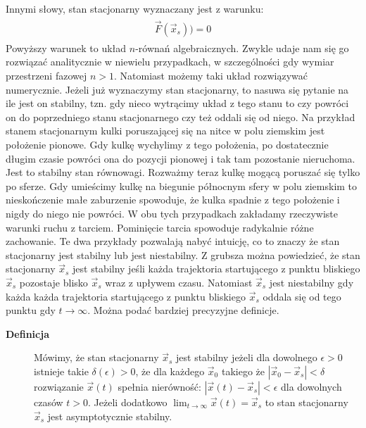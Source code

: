 \documentclass[a4paper,12pt,polish]{sphinxmanual}
\begin{document}
Innymi słowy, stan stacjonarny wyznaczany jest z warunku:
\label{ch1/chI023:equation-eqn4}\begin{gather}
\begin{split}\vec F(\vec x_s)) = 0\end{split}\label{ch1/chI023-eqn4}
\end{gather}
Powyższy warunek to układ $n$-równań algebraicznych. Zwykle udaje  nam się go rozwiązać analitycznie w niewielu przypadkach,  w szczególności gdy wymiar przestrzeni fazowej  $n >1$.  Natomiast możemy taki układ rozwiązywać numerycznie. Jeżeli już wyznaczymy stan stacjonarny, to nasuwa się pytanie na ile jest on stabilny, tzn. gdy nieco wytrącimy układ z tego stanu to czy powróci on do poprzedniego stanu stacjonarnego czy też oddali się od niego.  Na przykład stanem stacjonarnym kulki poruszającej się na nitce w polu ziemskim jest położenie pionowe. Gdy kulkę wychylimy z tego położenia, po dostatecznie długim czasie powróci ona do pozycji pionowej i tak tam pozostanie nieruchoma. Jest to stabilny stan równowagi. Rozważmy teraz kulkę mogącą poruszać się tylko po sferze. Gdy umieścimy kulkę na  biegunie północnym sfery w polu ziemskim to nieskończenie małe zaburzenie spowoduje, że kulka spadnie z tego położenie i nigdy do niego nie powróci. W obu tych przypadkach zakładamy  rzeczywiste warunki ruchu z tarciem. Pominięcie tarcia spowoduje radykalnie różne zachowanie. Te dwa przykłady pozwalają nabyć intuicję, co to znaczy że stan stacjonarny jest stabilny lub jest niestabilny.  Z grubsza można powiedzieć, że stan stacjonarny  $\vec x_s$ jest stabilny jeśli każda trajektoria startującego z punktu bliskiego $\vec x_s$ pozostaje blisko $\vec x_s$ wraz z upływem czasu. Natomiast  $\vec x_s$ jest niestabilny gdy  każda każda trajektoria startującego z punktu bliskiego $\vec x_s$ oddala się od tego punktu gdy $t\to \infty$.  Można podać bardziej precyzyjne definicje.
\begin{description}
\item[{\textbf{Definicja}}] \leavevmode
Mówimy, że stan stacjonarny  $\vec x_s$ jest stabilny jeżeli  dla dowolnego $\epsilon >0$ istnieje
takie $\delta(\epsilon) >0$, że dla każdego $\vec x_0$ takiego że $| \vec x_0 -\vec x_s| < \delta$
rozwiązanie $\vec x(t)$ spełnia nierówność: $|\vec x(t) - \vec x_s| < \epsilon$ dla dowolnych czasów $t>0$.
Jeżeli dodatkowo $\lim_{t\to \infty} \vec x(t)  = \vec x_s$ to stan stacjonarny $\vec x_s$ jest asymptotycznie stabilny.

\end{description}
\end{document}
